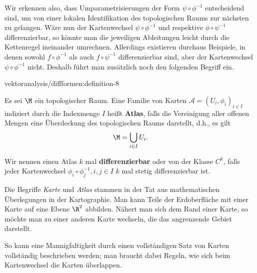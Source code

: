 \documentclass[letterpaper,10pt,english]{jupyterBook}
\begin{document}
\par
Wir erkennen also, dass Umparametrisierungen der Form \(\psi\circ \phi^{-1}\) entscheidend sind, um von einer lokalen Identifikation des topologischen Raums zur nächsten zu gelangen.
Wäre nun der Kartenwechsel \(\psi\circ \phi^{-1}\) und respektive \(\phi\circ \psi^{-1}\) differenzierbar, so könnte man die jeweiligen Ableitungen leicht durch die Kettenregel ineinander umrechnen.
Allerdings existieren durchaus Beispiele, in denen sowohl \(f\circ\phi^{-1}\) als auch \(f\circ\psi^{-1}\) differenzierbar sind, aber der Kartenwechsel \(\psi\circ\phi^{-1}\) nicht.
Deshalb führt man zusätzlich noch den folgenden Begriff ein.
\begin{definition}{}{vektoranalysis/diffformen:definition-8}



\par
Es sei \(\M\) ein topologischer Raum.
Eine Familie von Karten \(\mathcal{A} = (U_i,\phi_i)_{i\in I}\) indiziert durch die Indexmenge \(I\) heißt \textbf{Atlas}, falls die Vereinigung aller offenen Mengen eine Überdeckung des topologischen Raums darstellt, d.h., es gilt
\begin{align*}
\M = \bigcup_{i\in I} U_i.
\end{align*}
\par
Wir nennen einen Atlas \(k\) mal \textbf{differenzierbar} oder von der Klasse \(C^k\), falls jeder Kartenwechsel \(\phi_i\circ\phi_j^{-1}, i,j\in I\) \(k\) mal stetig differenzierbar ist.
\end{definition}

\par
Die Begriffe \emph{Karte} und \emph{Atlas} stammen in der Tat aus mathematischen Überlegungen in der Kartographie.
Man kann Teile der Erdoberfläche mit einer Karte auf eine Ebene \(\R^2\) abbilden.
Nähert man sich dem Rand einer Karte, so möchte man zu einer anderen Karte wechseln, die das angrenzende Gebiet darstellt.

\par
So kann eine Mannigfaltigkeit durch einen vollständigen Satz von Karten vollständig beschrieben werden; man braucht dabei Regeln, wie sich beim Kartenwechsel die Karten überlappen.
\end{document}
